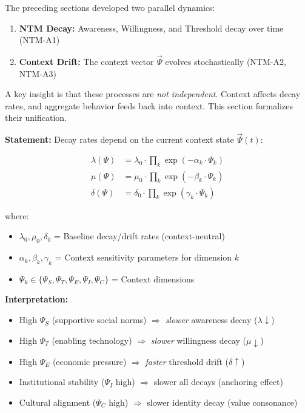 The preceding sections developed two parallel dynamics:
\begin{enumerate}[nosep]
\item \textbf{NTM Decay:} Awareness, Willingness, and Threshold decay over time (NTM-A1)
\item \textbf{Context Drift:} The context vector $\vec{\Psi}$ evolves stochastically (NTM-A2, NTM-A3)
\end{enumerate}

A key insight is that these processes are \emph{not independent}. Context affects decay rates, and aggregate behavior feeds back into context. This section formalizes their unification.

\begin{tcolorbox}[colback=blue!5!white, colframe=blue!75!black,
    title=\textbf{Axiom NTM-A5: Context-Modulated Decay Functions}]

\textbf{Statement:} Decay rates depend on the current context state $\vec{\Psi}(t)$:

\begin{align}
\lambda(\Psi) &= \lambda_0 \cdot \prod_{k} \exp(-\alpha_k \cdot \Psi_k) \label{eq:lambda-psi} \\
\mu(\Psi) &= \mu_0 \cdot \prod_{k} \exp(-\beta_k \cdot \Psi_k) \label{eq:mu-psi} \\
\delta(\Psi) &= \delta_0 \cdot \prod_{k} \exp(\gamma_k \cdot \Psi_k) \label{eq:delta-psi}
\end{align}

where:
\begin{itemize}[nosep]
\item $\lambda_0, \mu_0, \delta_0$ = Baseline decay/drift rates (context-neutral)
\item $\alpha_k, \beta_k, \gamma_k$ = Context sensitivity parameters for dimension $k$
\item $\Psi_k \in \{\Psi_S, \Psi_T, \Psi_E, \Psi_I, \Psi_C\}$ = Context dimensions
\end{itemize}

\textbf{Interpretation:}
\begin{itemize}[nosep]
\item High $\Psi_S$ (supportive social norms) $\Rightarrow$ \emph{slower} awareness decay ($\lambda \downarrow$)
\item High $\Psi_T$ (enabling technology) $\Rightarrow$ \emph{slower} willingness decay ($\mu \downarrow$)
\item High $\Psi_E$ (economic pressure) $\Rightarrow$ \emph{faster} threshold drift ($\delta \uparrow$)
\item Institutional stability ($\Psi_I$ high) $\Rightarrow$ slower all decays (anchoring effect)
\item Cultural alignment ($\Psi_C$ high) $\Rightarrow$ slower identity decay (value consonance)
\end{itemize}


\end{tcolorbox}
